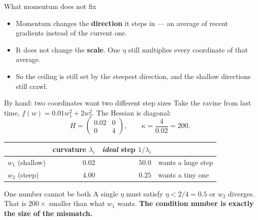 \documentclass[aspectratio=169]{beamer}
\begin{document}
\begin{frame}[shrink=6]{What momentum does not fix}
  \begin{itemize}
    \item<1-> Momentum changes the \textbf{direction} it steps in --- an
      average of recent gradients instead of the current one.
    \item<2-> It does not change the \textbf{scale}. One $\eta$ still multiplies
      every coordinate of that average.
    \item<3-> So the ceiling is still set by the steepest direction, and the
      shallow directions still crawl.
  \end{itemize}
  \vspace{0.7em}
  \vspace{0.3em}
\end{frame}

\begin{frame}[shrink=6]{By hand: two coordinates want two different step sizes}
  Take the ravine from last time, $f(w) = 0.01 w_1^2 + 2 w_2^2$. The Hessian is
  diagonal:
  \[
    H = \begin{pmatrix} 0.02 & 0 \\ 0 & 4 \end{pmatrix},
    \qquad \kappa = \frac{4}{0.02} = 200 .
  \]
  \begin{center}\small
  \begin{tabular}{@{}lrrl@{}}
    \toprule
    & curvature $\lambda_i$ & \emph{ideal} step $1/\lambda_i$ & \\
    \midrule
    $w_1$ (shallow) & $0.02$ & $50.0$ & wants a huge step\\
    $w_2$ (steep)   & $4.00$ & $0.25$ & wants a tiny one\\
    \bottomrule
  \end{tabular}
  \end{center}
  \vspace{0.3em}
  \begin{alertblock}{One number cannot be both}
    \small A single $\eta$ must satisfy $\eta < 2/4 = 0.5$ or $w_2$ diverges.
    That is $200\times$ smaller than what $w_1$ wants. \textbf{The condition
    number is exactly the size of the mismatch.}
  \end{alertblock}
\end{frame}
\end{document}
